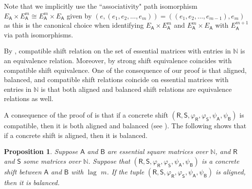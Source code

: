 \documentclass[11pt, letterpaper,final]{amsart}
\newcommand{\bbN}{{\mathbb{N}}}
\newcommand{\lag}{\operatorname{lag}}
\newtheorem{prp}[thm]{Proposition}
\theoremstyle{definition}
\begin{document}
Note that we implicitly use the ``associativity" path isomorphism $E_\mathsf{A} \times E_\mathsf{A}^m \cong E_\mathsf{A}^m \times E_\mathsf{A}$ given by $( e, (e_1, e_2, \ldots, e_m)) = ( (e_1, e_2, \ldots, e_{m-1}) , e_m )$ as this is the canonical choice when identifying $E_\mathsf{A} \times E_\mathsf{A}^m$ and $E_\mathsf{A}^m \times E_\mathsf{A}$ with $E_\mathsf{A}^{m+1}$ via path isomorphisms.

By \cite[Proposition~4.4]{CDE}, compatible shift relation on the set of essential matrices with entries in $\mathbb{N}$ is an equivalence relation. Moreover, by \cite[Theorem~1.3]{CDE} strong shift equivalence coincides with compatible shift equivalence.  One of the consequence of our proof is that aligned, balanced, and compatible shift relations coincide on essential matrices with entries in $\bbN$ is that both aligned and balanced shift relations are equivalence relations as well. 

A consequence of the proof of \cite[Lemma~4.2]{CDE} is that if a concrete shift $(\mathsf{R}, \mathsf{S}, \varphi_\mathsf{R}, \varphi_\mathsf{S}, \psi_\mathsf{A}, \psi_\mathsf{B})$ is compatible, then it is both aligned and balanced (see \cite[Remark~4.3]{CDE}). The following shows that if a concrete shift is aligned, then it is balanced.

\begin{prp} \label{p:aligned->balanced}
Suppose $\mathsf{A}$ and $\mathsf{B}$ are essential square matrices over $\bbN$, and $\mathsf{R}$ and $\mathsf{S}$ some matrices over $\bbN$. Suppose that $(\mathsf{R}, \mathsf{S}, \varphi_\mathsf{R}, \varphi_\mathsf{S}, \psi_\mathsf{A}, \psi_\mathsf{B})$ is a concrete shift between $\mathsf{A}$ and $\mathsf{B}$ with $\lag$ $m$. If the tuple $(\mathsf{R}, \mathsf{S}, \varphi_\mathsf{R}, \varphi_\mathsf{S}, \psi_\mathsf{A}, \psi_\mathsf{B})$ is aligned, then it is balanced. 
\end{prp}
\end{document}
